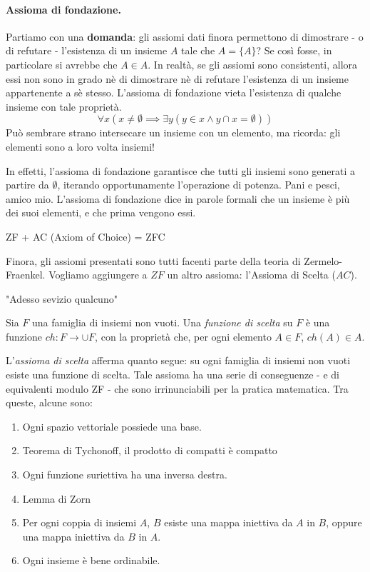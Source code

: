 \paragraph{Assioma di fondazione.} Partiamo con una {\bf domanda}: gli assiomi dati finora permettono di dimostrare - o di refutare - l'esistenza di un insieme \(A\) tale che \(A = \lbrace A \rbrace\)? Se così fosse, in particolare si avrebbe che \(A \in A\). In realtà, se gli assiomi sono consistenti, allora essi non sono in grado nè di dimostrare nè di refutare l'esistenza di un insieme appartenente a sè stesso. L'assioma di fondazione vieta l'esistenza di qualche insieme con tale proprietà.
\begin{equation}
  \forall x (x \ne \emptyset \implies \exists y (y \in x \land y \cap x = \emptyset))
\end{equation}
Può sembrare strano intersecare un insieme con un elemento, ma ricorda: gli elementi sono a loro volta insiemi!

In effetti, l'assioma di fondazione garantisce che tutti gli insiemi sono generati a partire da \(\emptyset\), iterando opportunamente l'operazione di potenza. Pani e pesci, amico mio. L'assioma di fondazione dice in parole formali che un insieme è più dei suoi elementi, e che prima vengono essi.

ZF + AC (Axiom of Choice) = ZFC

Finora, gli assiomi presentati sono tutti facenti parte della teoria di Zermelo-Fraenkel. Vogliamo aggiungere a \(ZF\) un altro assioma: l'Assioma di Scelta (\(AC\)).

"Adesso sevizio qualcuno"

\begin{dfn}
Sia \(F\) una famiglia di insiemi non vuoti. Una \emph{funzione di scelta} su \(F\) è una funzione \(ch \colon F \to \cup F\), con la proprietà che, per ogni elemento \(A \in F\), \(ch(A) \in A\).
\end{dfn}

L'\emph{assioma di scelta} afferma quanto segue: su ogni famiglia di insiemi non vuoti esiste una funzione di scelta. Tale assioma ha una serie di conseguenze - e di equivalenti modulo ZF - che sono irrinunciabili per la pratica matematica. Tra queste, alcune sono:
\begin{enumerate}
  \item Ogni spazio vettoriale possiede una base.
  \item Teorema di Tychonoff, il prodotto di compatti è compatto
  \item Ogni funzione suriettiva ha una inversa destra.
  \item Lemma di Zorn
  \item Per ogni coppia di insiemi \(A\), \(B\) esiste una mappa iniettiva da \(A\) in \(B\), oppure una mappa iniettiva da \(B\) in \(A\).
  \item Ogni insieme è bene ordinabile.
\end{enumerate}

